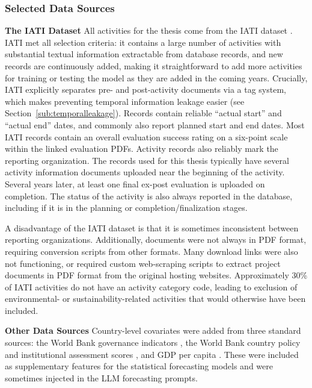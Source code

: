 \documentclass[12pt,a4paper]{article}
\let\citep\parencite
\begin{document}
\subsubsection{Selected Data Sources}
\textbf{The IATI Dataset} All activities for the thesis come from the IATI dataset \citep{IATIDashboardIATI}. IATI met all selection criteria: it contains a large number of activities with substantial textual information extractable from database records, and new records are continuously added, making it straightforward to add more activities for training or testing the model as they are added in the coming years. Crucially, IATI explicitly separates pre- and post-activity documents via a tag system, which makes preventing temporal information leakage easier (see Section~\ref{sub:temporalleakage}). Records contain reliable ``actual start'' and ``actual end'' dates, and commonly also report planned start and end dates. Most IATI records contain an overall evaluation success rating on a six-point scale within the linked evaluation PDFs. Activity records also reliably mark the reporting organization. The records used for this thesis typically have several activity information documents uploaded near the beginning of the activity. Several years later, at least one final ex-post evaluation is uploaded on completion. The status of the activity is also always reported in the database, including if it is in the planning or completion/finalization stages.

A disadvantage of the IATI dataset is that it is sometimes inconsistent between reporting organizations. Additionally, documents were not always in PDF format, requiring conversion scripts from other formats. Many download links were also not functioning, or required custom web-scraping scripts to extract project documents in PDF format from the original hosting websites. Approximately 30\% of IATI activities do not have an activity category code, leading to exclusion of environmental- or sustainability-related activities that would otherwise have been included.

\textbf{Other Data Sources} Country-level covariates were added from three standard sources: the World Bank governance indicators \citep{kaufmannWorldwideGovernanceIndicators2024}, the World Bank country policy and institutional assessment scores \citep{worldbankCPIACriteria2024}, and GDP per capita \citep{worldbankGDPPerCapita}. These were included as supplementary features for the statistical forecasting models and were sometimes injected in the LLM forecasting prompts.
\end{document}
